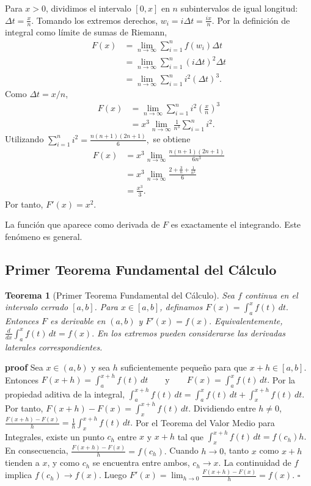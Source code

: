 \documentclass[12pt]{article}
\newtheorem{Teo}{Teorema}
\begin{document}
Para $x>0$, dividimos el intervalo $[0,x]$ en $n$ subintervalos de igual
longitud:
$
\Delta t=\frac{x}{n}.
$
Tomando los extremos derechos,
$
w_i=i\Delta t=\frac{ix}{n}.
$
Por la definición de integral como límite de sumas de Riemann,
\begin{align*}
F(x)
&=\lim_{n\to\infty}\sum_{i=1}^n f(w_i)\Delta t\\
&=\lim_{n\to\infty}\sum_{i=1}^n
\left(i\Delta t\right)^2\Delta t\\
&=\lim_{n\to\infty}\sum_{i=1}^n i^2(\Delta t)^3.
\end{align*}
Como $\Delta t=x/n$,
\begin{align*}
F(x)
&=\lim_{n\to\infty}\sum_{i=1}^n i^2\left(\frac{x}{n}\right)^3\\
&=x^3\lim_{n\to\infty}\frac{1}{n^3}\sum_{i=1}^n i^2.
\end{align*}
Utilizando
$
\sum_{i=1}^n i^2=\frac{n(n+1)(2n+1)}{6},
$
se obtiene
\begin{align*}
F(x)
&=x^3\lim_{n\to\infty}
\frac{n(n+1)(2n+1)}{6n^3}\\
&=x^3\lim_{n\to\infty}
\frac{2+\frac{3}{n}+\frac{1}{n^2}}{6}\\
&=\frac{x^3}{3}.
\end{align*}
Por tanto,
$
F'(x)=x^2.
$

La función que aparece como derivada de $F$ es exactamente el integrando.
Este fenómeno es general.
\subsection*{Primer Teorema Fundamental del Cálculo}
\begin{Teo}[Primer Teorema Fundamental del Cálculo]
Sea $f$ continua en el intervalo cerrado $[a,b]$. Para $x\in[a,b]$,
definamos
$
F(x)=\int_a^x f(t)\,dt.
$
Entonces $F$ es derivable en $(a,b)$ y
$
\boxed{F'(x)=f(x).}
$
Equivalentemente,
$
\boxed{
\frac{d}{dx}\int_a^x f(t)\,dt=f(x).
}
$
En los extremos pueden considerarse las derivadas laterales correspondientes.
\end{Teo}

\textbf{proof}
Sea $x\in(a,b)$ y sea $h$ suficientemente pequeño para que $x+h\in[a,b]$.
Entonces
$
F(x+h)=\int_a^{x+h}f(t)\,dt
\qquad\text{y}\qquad
F(x)=\int_a^x f(t)\,dt.
$
Por la propiedad aditiva de la integral,
$
\int_a^{x+h}f(t)\,dt
=
\int_a^x f(t)\,dt
+
\int_x^{x+h}f(t)\,dt.
$
Por tanto,
$
F(x+h)-F(x)
=
\int_x^{x+h}f(t)\,dt.
$
Dividiendo entre $h\ne0$,
$
\frac{F(x+h)-F(x)}{h}
=
\frac{1}{h}\int_x^{x+h}f(t)\,dt.
$
Por el Teorema del Valor Medio para Integrales, existe un punto $c_h$ entre
$x$ y $x+h$ tal que
$
\int_x^{x+h}f(t)\,dt=f(c_h)h.
$
En consecuencia,
$
\frac{F(x+h)-F(x)}{h}=f(c_h).
$
Cuando $h\to0$, tanto $x$ como $x+h$ tienden a $x$, y como $c_h$ se encuentra
entre ambos,
$
c_h\to x.
$
La continuidad de $f$ implica
$
f(c_h)\to f(x).
$
Luego
$
F'(x)
=
\lim_{h\to0}\frac{F(x+h)-F(x)}{h}
=
f(x).
$
\hfill$\square$
\end{document}
